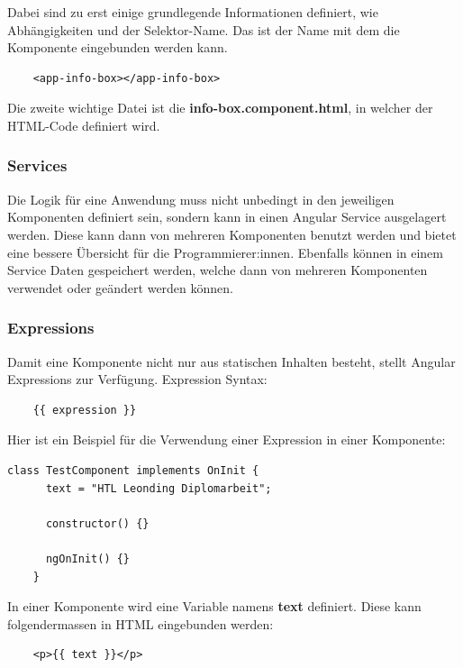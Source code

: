 Dabei sind zu erst einige grundlegende Informationen definiert, wie Abhängigkeiten und der Selektor-Name. Das ist der Name mit dem die Komponente eingebunden werden kann.

\begin{lstlisting}
    <app-info-box></app-info-box>
\end{lstlisting}

Die zweite wichtige Datei ist die \textbf{info-box.component.html}, in welcher der HTML-Code definiert wird.

\subsubsection{Services}
Die Logik für eine Anwendung muss nicht unbedingt in den jeweiligen Komponenten definiert sein, sondern kann in einen Angular Service ausgelagert werden. Diese kann dann von mehreren Komponenten benutzt werden und bietet eine bessere Übersicht für die Programmierer:innen.
Ebenfalls können in einem Service Daten gespeichert werden, welche dann von mehreren Komponenten verwendet oder geändert werden können.

\subsubsection{Expressions}
Damit eine Komponente nicht nur aus statischen Inhalten besteht, stellt Angular Expressions zur Verfügung.
Expression Syntax:

\begin{lstlisting}
    {{ expression }}
\end{lstlisting}

Hier ist ein Beispiel für die Verwendung einer Expression in einer Komponente:

\begin{lstlisting}[caption=Expression Verwendung]
    class TestComponent implements OnInit {
      text = "HTL Leonding Diplomarbeit";
    
      constructor() {}
    
      ngOnInit() {}
    }
\end{lstlisting}

In einer Komponente wird eine Variable namens \textbf{text} definiert. Diese kann folgendermassen in HTML eingebunden werden:

\begin{lstlisting}
    <p>{{ text }}</p>
\end{lstlisting}

